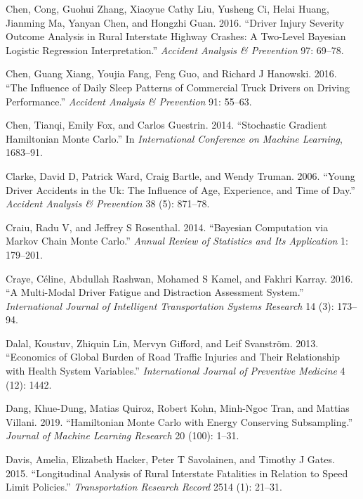 \documentclass[12pt]{book}
\numberwithin{equation}{chapter}
\begin{document}
\leavevmode\hypertarget{ref-chen2016driver}{}%
Chen, Cong, Guohui Zhang, Xiaoyue Cathy Liu, Yusheng Ci, Helai Huang, Jianming Ma, Yanyan Chen, and Hongzhi Guan. 2016. ``Driver Injury Severity Outcome Analysis in Rural Interstate Highway Crashes: A Two-Level Bayesian Logistic Regression Interpretation.'' \emph{Accident Analysis \& Prevention} 97: 69--78.

\leavevmode\hypertarget{ref-chen2016influence}{}%
Chen, Guang Xiang, Youjia Fang, Feng Guo, and Richard J Hanowski. 2016. ``The Influence of Daily Sleep Patterns of Commercial Truck Drivers on Driving Performance.'' \emph{Accident Analysis \& Prevention} 91: 55--63.

\leavevmode\hypertarget{ref-chen2014stochastic}{}%
Chen, Tianqi, Emily Fox, and Carlos Guestrin. 2014. ``Stochastic Gradient Hamiltonian Monte Carlo.'' In \emph{International Conference on Machine Learning}, 1683--91.

\leavevmode\hypertarget{ref-clarke2006young}{}%
Clarke, David D, Patrick Ward, Craig Bartle, and Wendy Truman. 2006. ``Young Driver Accidents in the Uk: The Influence of Age, Experience, and Time of Day.'' \emph{Accident Analysis \& Prevention} 38 (5): 871--78.

\leavevmode\hypertarget{ref-craiu2014bayesian}{}%
Craiu, Radu V, and Jeffrey S Rosenthal. 2014. ``Bayesian Computation via Markov Chain Monte Carlo.'' \emph{Annual Review of Statistics and Its Application} 1: 179--201.

\leavevmode\hypertarget{ref-craye2016multi}{}%
Craye, Céline, Abdullah Rashwan, Mohamed S Kamel, and Fakhri Karray. 2016. ``A Multi-Modal Driver Fatigue and Distraction Assessment System.'' \emph{International Journal of Intelligent Transportation Systems Research} 14 (3): 173--94.

\leavevmode\hypertarget{ref-dalal2013economics}{}%
Dalal, Koustuv, Zhiquin Lin, Mervyn Gifford, and Leif Svanström. 2013. ``Economics of Global Burden of Road Traffic Injuries and Their Relationship with Health System Variables.'' \emph{International Journal of Preventive Medicine} 4 (12): 1442.

\leavevmode\hypertarget{ref-dang2019hamiltonian}{}%
Dang, Khue-Dung, Matias Quiroz, Robert Kohn, Minh-Ngoc Tran, and Mattias Villani. 2019. ``Hamiltonian Monte Carlo with Energy Conserving Subsampling.'' \emph{Journal of Machine Learning Research} 20 (100): 1--31.

\leavevmode\hypertarget{ref-davis2015longitudinal}{}%
Davis, Amelia, Elizabeth Hacker, Peter T Savolainen, and Timothy J Gates. 2015. ``Longitudinal Analysis of Rural Interstate Fatalities in Relation to Speed Limit Policies.'' \emph{Transportation Research Record} 2514 (1): 21--31.
\end{document}
